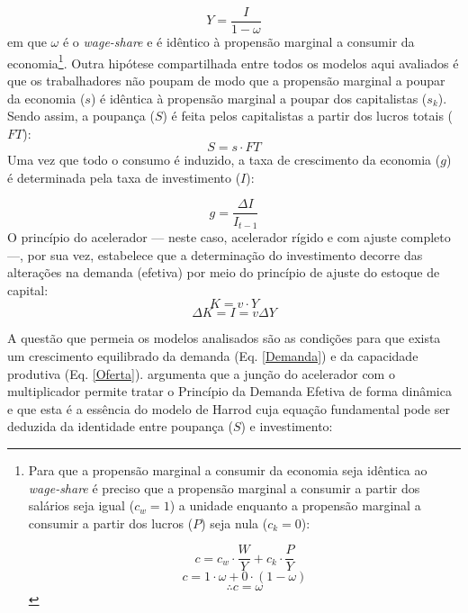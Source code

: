 \begin{equation}
\label{Demanda}
Y = \frac{I}{1-\omega}
\end{equation}
em que $\omega$ é o \textit{wage-share} e é idêntico à propensão marginal a consumir da economia\footnote{
	Para que a propensão marginal a consumir da economia seja idêntica ao \textit{wage-share} é preciso que a propensão marginal a consumir a partir dos salários seja igual ($c_w = 1$) a unidade enquanto a propensão marginal a consumir a partir dos lucros ($P$) seja nula ($c_k = 0$):
	
	$$
	c = c_w\cdot \frac{W}{Y} + c_k\cdot \frac{P}{Y}
	$$
	$$
	c = 1\cdot \omega + 0\cdot (1-\omega)
	$$
	$$
	\therefore c = \omega
	$$
	
}.
Outra hipótese compartilhada entre todos os modelos aqui avaliados é que os trabalhadores não poupam de modo que a propensão marginal a poupar da economia ($s$) é idêntica à propensão marginal a poupar dos capitalistas ($s_k$). 
Sendo assim, a poupança ($S$) é feita pelos capitalistas a partir dos lucros totais ($FT$):
$$
S = s\cdot FT
$$
Uma vez que todo o consumo é induzido, a taxa de crescimento da economia ($g$) é determinada pela taxa de investimento ($I$):

\begin{equation}
\label{crescimento_efetivo}
	g = \frac{\Delta I}{I_{t-1}}
\end{equation}
O princípio do acelerador --- neste caso, acelerador rígido e com ajuste completo ---, por sua vez, estabelece que a determinação do investimento decorre das alterações na demanda (efetiva) por meio do princípio de ajuste do estoque de capital:
$$
K = v\cdot Y
$$
\begin{equation}
\Delta K = I = v\Delta Y
\end{equation}


A questão que permeia os modelos analisados são as condições para que exista um crescimento equilibrado da demanda (Eq. \ref{Demanda}) e da capacidade produtiva (Eq. \ref{Oferta}). 
\textcite{harrod_essay_1939} argumenta que a junção do acelerador com o multiplicador permite tratar o Princípio da Demanda Efetiva de forma dinâmica e que esta é a essência do modelo de Harrod cuja equação fundamental pode ser deduzida da identidade entre poupança ($S$) e investimento:

